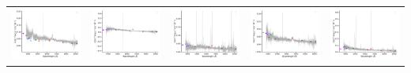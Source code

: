 \begin{center}
\begin{longtable}{l l l l l }
    \includegraphics[width=0.19\linewidth, clip]{Figs/Figs-sdss/spec-0673-52162-0547-STRIPE82-0140-024629.pdf} & \includegraphics[width=0.19\linewidth, clip]{Figs/Figs-sdss/spec-0674-52201-0135-SPLUS-s02s12-025538.pdf} & \includegraphics[width=0.19\linewidth, clip]{Figs/Figs-sdss/spec-0685-52203-0487-STRIPE82-0002-029499.pdf} & \includegraphics[width=0.19\linewidth, clip]{Figs/Figs-sdss/spec-0687-52518-0113-STRIPE82-0008-003185.pdf} & \includegraphics[width=0.19\linewidth, clip]{Figs/Figs-sdss/spec-0687-52518-0444-STRIPE82-0008-056238.pdf} \\

\end{longtable}
\end{center}
